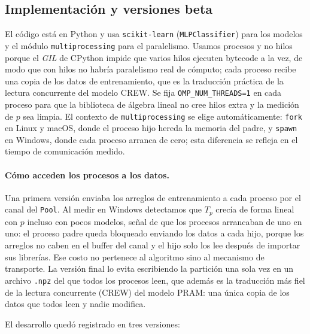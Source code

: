 \documentclass[11pt,a4paper]{article}
\begin{document}
\subsection{Implementación y versiones beta}

El código está en Python y usa \texttt{scikit-learn} (\texttt{MLPClassifier}) para los modelos y el módulo \texttt{multiprocessing} para el paralelismo. Usamos procesos y no hilos porque el \emph{GIL} de CPython impide que varios hilos ejecuten bytecode a la vez, de modo que con hilos no habría paralelismo real de cómputo; cada proceso recibe una copia de los datos de entrenamiento, que es la traducción práctica de la lectura concurrente del modelo CREW. Se fija \texttt{OMP\_NUM\_THREADS=1} en cada proceso para que la biblioteca de álgebra lineal no cree hilos extra y la medición de $p$ sea limpia. El contexto de \texttt{multiprocessing} se elige automáticamente: \texttt{fork} en Linux y macOS, donde el proceso hijo hereda la memoria del padre, y \texttt{spawn} en Windows, donde cada proceso arranca de cero; esta diferencia se refleja en el tiempo de comunicación medido.

\paragraph{Cómo acceden los procesos a los datos.} Una primera versión enviaba los arreglos de entrenamiento a cada proceso por el canal del \texttt{Pool}. Al medir en Windows detectamos que $T_p$ crecía de forma lineal con $p$ incluso con pocos modelos, señal de que los procesos arrancaban de uno en uno: el proceso padre queda bloqueado enviando los datos a cada hijo, porque los arreglos no caben en el buffer del canal y el hijo solo los lee después de importar sus librerías. Ese costo no pertenece al algoritmo sino al mecanismo de transporte. La versión final lo evita escribiendo la partición una sola vez en un archivo \texttt{.npz} del que todos los procesos leen, que además es la traducción más fiel de la lectura concurrente (CREW) del modelo PRAM: una única copia de los datos que todos leen y nadie modifica.

El desarrollo quedó registrado en tres versiones:
\end{document}
